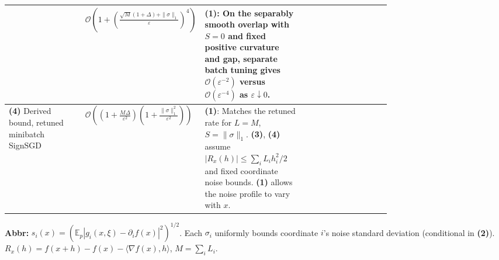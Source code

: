 \begin{table}[tp]
\begin{threeparttable}
\begin{tabularx}{\linewidth}{@{}>{\raggedright\arraybackslash}p{0.20\linewidth}>{\raggedright\arraybackslash}p{0.30\linewidth}>{\raggedright\arraybackslash}p{0.26\linewidth}>{\raggedright\arraybackslash}X@{}}
& $\mathcal{O}\!\left(1+\left(\frac{\sqrt{M}(1+\Delta)+\|\sigma\|_1}{\varepsilon}\right)^4\right)$
& \textbf{(1)}: On the separably smooth overlap with $S=0$ and fixed positive curvature and gap, separate batch tuning gives $\mathcal{O}(\varepsilon^{-2})$ versus $\mathcal{O}(\varepsilon^{-4})$ as $\varepsilon\downarrow0$.
& \\
\midrule
\textbf{(4)} Derived bound, retuned minibatch SignSGD \citep{pmlr-v80-bernstein18a}
& $\mathcal{O}\!\left(\left(1+\frac{M\Delta}{\varepsilon^2}\right)\!\left(1+\frac{\|\sigma\|_1^2}{\varepsilon^2}\right)\right)$
& \textbf{(1)}: Matches the retuned rate for $L=M$, $S=\|\sigma\|_1$. \textbf{(3)}, \textbf{(4)} assume $|R_x(h)|\le\sum_i L_i h_i^2/2$ and fixed coordinate noise bounds. \textbf{(1)} allows the noise profile to vary with $x$.
& \\
\bottomrule
\end{tabularx}
\begin{tablenotes}[flushleft]\footnotesize
\item[] \textbf{Abbr:} $s_i(x)=(\mathbb E_p|g_i(x,\xi)-\partial_i f(x)|^2)^{1/2}$. Each $\sigma_i$ uniformly bounds coordinate $i$'s noise standard deviation (conditional in \textbf{(2)}). $R_x(h)=f(x+h)-f(x)-\langle\nabla f(x),h\rangle$, $M=\sum_i L_i$.
\end{tablenotes}
\end{threeparttable}
\end{table}
